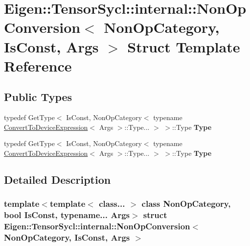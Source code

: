 \hypertarget{struct_eigen_1_1_tensor_sycl_1_1internal_1_1_non_op_conversion}{}\section{Eigen\+:\+:Tensor\+Sycl\+:\+:internal\+:\+:Non\+Op\+Conversion$<$ Non\+Op\+Category, Is\+Const, Args $>$ Struct Template Reference}
\label{struct_eigen_1_1_tensor_sycl_1_1internal_1_1_non_op_conversion}
\subsection*{Public Types}
\begin{DoxyCompactItemize}
\item 
\mbox{\label{struct_eigen_1_1_tensor_sycl_1_1internal_1_1_non_op_conversion_a97e54c2c8d5311834ccfad7160557042}} 
typedef Get\+Type$<$ Is\+Const, Non\+Op\+Category$<$ typename \hyperlink{struct_eigen_1_1_tensor_sycl_1_1internal_1_1_convert_to_device_expression}{Convert\+To\+Device\+Expression}$<$ Args $>$\+::Type... $>$ $>$\+::Type {\bfseries Type}
\item 
\mbox{\label{struct_eigen_1_1_tensor_sycl_1_1internal_1_1_non_op_conversion_a97e54c2c8d5311834ccfad7160557042}} 
typedef Get\+Type$<$ Is\+Const, Non\+Op\+Category$<$ typename \hyperlink{struct_eigen_1_1_tensor_sycl_1_1internal_1_1_convert_to_device_expression}{Convert\+To\+Device\+Expression}$<$ Args $>$\+::Type... $>$ $>$\+::Type {\bfseries Type}
\end{DoxyCompactItemize}


\subsection{Detailed Description}
\subsubsection*{template$<$template$<$ class... $>$ class Non\+Op\+Category, bool Is\+Const, typename... Args$>$\newline
struct Eigen\+::\+Tensor\+Sycl\+::internal\+::\+Non\+Op\+Conversion$<$ Non\+Op\+Category, Is\+Const, Args $>$}



